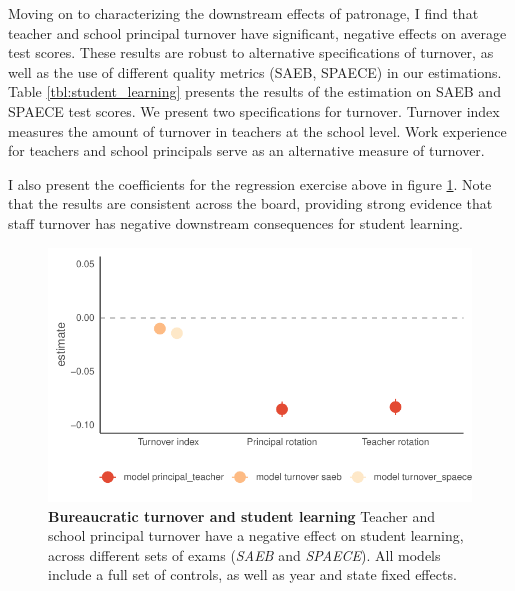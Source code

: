 \documentclass[12pt,a4paper]{article}
\begin{document}
Moving on to characterizing the downstream effects of patronage, I find that teacher and school principal turnover have significant, negative effects on average test scores. These results are robust to alternative specifications of turnover, as well as the use of different quality metrics (SAEB, SPAECE) in our estimations. Table \ref{tbl:student_learning} presents the results of the estimation on SAEB and SPAECE test scores. We present two specifications for turnover. Turnover index measures the amount of turnover in teachers at the school level. Work experience for teachers and school principals serve as an alternative measure of turnover.

\begin{landscape}
    \begin{table}[t]
      \centering
      \footnotesize
      
      \caption{{\bf Bureaucratic turnover and student learning} Teacher and school principal turnover have a negative effect on student learning. Models 1 and 2 present results for teacher turnover index constructed at the school level. Models 3 and 4 estimate the effect of new teachers and school principals entering the school (less than two years). All models include year and state fixed effects.}
      \label{tbl:student_learning}
    \end{table}
\end{landscape}

I also present the coefficients for the regression exercise above in figure \ref{fig:hlm_mods}. Note that the results are consistent across the board, providing strong evidence that staff turnover has negative downstream consequences for student learning.

\begin{figure}[h]
  \centering
  \includegraphics[width=0.6\linewidth]{plots/model_turnover_learning.pdf}
  \caption{{\bf Bureaucratic turnover and student learning} Teacher and school principal turnover have a negative effect on student learning, across different sets of exams (\emph{SAEB} and \emph{SPAECE}). All models include a full set of controls, as well as year and state fixed effects.}
  \label{fig:hlm_mods}
\end{figure}
\end{document}
